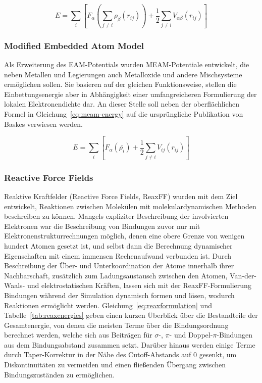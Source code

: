 \begin{equation}
  \label{eq:eam-energy}
  E = \sum_i\left[F_\alpha\left(\sum_{j\neq i}{\rho_\beta\left(r_{ij}\right)}\right) + \frac{1}{2}\sum_{j\neq i}{V_{\alpha\beta}\left(r_{ij}\right)}\right]
\end{equation}

\subsubsection{Modified Embedded Atom Model}

Als Erweiterung des EAM-Potentials wurden MEAM-Potentiale entwickelt, die neben Metallen und Legierungen auch Metalloxide und andere Mischsysteme ermöglichen sollen. 
Sie basieren auf der gleichen Funktionsweise, stellen die Einbettungsenergie aber in Abhängigkeit einer umfangreicheren Formulierung der lokalen Elektronendichte dar.
An dieser Stelle soll neben der oberflächlichen Formel in Gleichung~\ref{eq:meam-energy} auf die ursprüngliche Publikation von Baskes  verwiesen werden.

\begin{equation}
  \label{eq:meam-energy}
  E = \sum_i\left[F_\alpha\left(\bar{\rho_i}\right) + \frac{1}{2}\sum_{j\neq i}{V_{ij}\left(r_{ij}\right)}\right]
\end{equation}

\subsubsection{Reactive Force Fields}

Reaktive Kraftfelder (Reactive Force Fields, ReaxFF) wurden mit dem Ziel entwickelt, Reaktionen zwischen Molekülen mit molekulardynamischen Methoden beschreiben zu können.
Mangels expliziter Beschreibung der involvierten Elektronen war die Beschreibung von Bindungen zuvor nur mit Elektronenstrukturrechnungen möglich, denen eine obere Grenze von wenigen hundert Atomen gesetzt ist, und selbst dann die Berechnung dynamischer Eigenschaften mit einem immensen Rechenaufwand verbunden ist.
Durch Beschreibung der Über- und Unterkoordination der Atome innerhalb ihrer Nachbarschaft, zusätzlich zum Ladungsaustausch zwischen den Atomen, Van-der-Waals- und elektrostatischen Kräften, lassen sich mit der ReaxFF-Formulierung Bindungen während der Simulation dynamisch formen und lösen, wodurch Reaktionen ermöglicht werden.
Gleichung~\ref{eq:reaxformulation} und Tabelle~\ref{tab:reaxenergies} geben einen kurzen Überblick über die Bestandteile der Gesamtenergie, von denen die meisten Terme über die Bindungsordnung berechnet werden, welche sich aus Beiträgen für $\sigma$-, $\pi$- und Doppel-$\pi$-Bindungen aus dem Bindungsabstand zusammen setzt.
Darüber hinaus werden einige Terme durch Taper-Korrektur in der Nähe des Cutoff-Abstands auf 0 gesenkt, um Diskontinuitäten zu vermeiden und einen fließenden Übergang zwischen Bindungszuständen zu ermöglichen.

